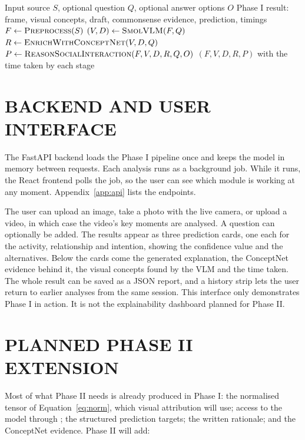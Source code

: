 \begin{algorithm}[H]
\caption{Phase I Pipeline}
\label{alg:pipeline}
\begin{algorithmic}[1]
\Require Input source $S$, optional question $Q$, optional answer options $O$
\Ensure Phase I result: frame, visual concepts, draft, commonsense evidence, prediction, timings
\State $F \gets \textsc{Preprocess}(S)$ 
\State $(V, D) \gets \textsc{SmolVLM}(F, Q)$ 
\State $R \gets \textsc{EnrichWithConceptNet}(V, D, Q)$ 
\State $P \gets \textsc{ReasonSocialInteraction}(F, V, D, R, Q, O)$ 
\State \Return $(F, V, D, R, P)$ with the time taken by each stage
\end{algorithmic}
\end{algorithm}

\section{BACKEND AND USER INTERFACE}

The FastAPI backend loads the Phase I pipeline once and keeps the model in memory between requests. Each analysis runs as a background job. While it runs, the React frontend polls the job, so the user can see which module is working at any moment. Appendix~\ref{app:api} lists the endpoints.

The user can upload an image, take a photo with the live camera, or upload a video, in which case the video's key moments are analysed. A question can optionally be added. The results appear as three prediction cards, one each for the activity, relationship and intention, showing the confidence value and the alternatives. Below the cards come the generated explanation, the ConceptNet evidence behind it, the visual concepts found by the VLM and the time taken. The whole result can be saved as a JSON report, and a history strip lets the user return to earlier analyses from the same session. This interface only demonstrates Phase I in action. It is not the explainability dashboard planned for Phase II.

\section{PLANNED PHASE II EXTENSION}
\label{sec:phase2plan}

Most of what Phase II needs is already produced in Phase I: the normalised tensor of Equation~\ref{eq:norm}, which visual attribution will use; access to the model through ; the structured prediction targets; the written rationale; and the ConceptNet evidence. Phase II will add:

